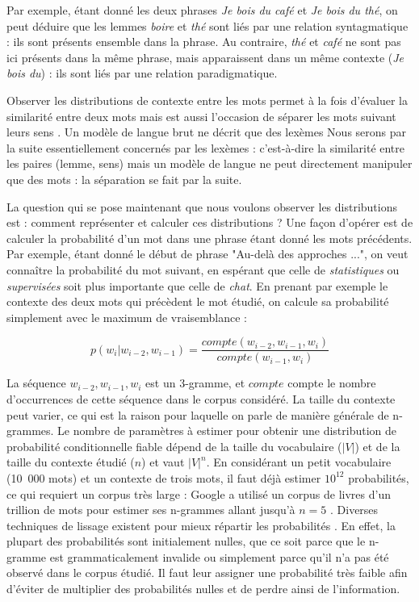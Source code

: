 Par exemple, étant donné les deux phrases \emph{Je bois du café} et \emph{Je
bois du thé}, on peut déduire que les lemmes \emph{boire} et \emph{thé} sont
liés par une relation syntagmatique : ils sont présents ensemble dans la
phrase. Au contraire, \emph{thé} et \emph{café} ne sont pas ici présents dans
la même phrase, mais apparaissent dans un même contexte (\emph{Je bois du}) :
ils sont liés par une relation paradigmatique.

Observer les distributions de contexte entre les mots permet à la fois
d'évaluer la similarité entre deux mots mais est aussi l'occasion de séparer
les mots suivant leurs sens \citep{yarowsky1993one,pantel2002discovering}. Un modèle de langue brut ne décrit que des lexèmes Nous
serons par la suite essentiellement concernés par les lexèmes : c'est-à-dire la
similarité entre les paires (lemme, sens) mais un modèle de langue ne peut
directement manipuler que des mots : la séparation se fait par la suite.


La question qui se pose maintenant que nous voulons observer les distributions
est : comment représenter et calculer ces distributions ? Une façon d'opérer
est de calculer la probabilité d'un mot dans une phrase étant donné les mots
précédents. Par exemple, étant donné le début de phrase "Au-delà des approches
...", on veut connaître la probabilité du mot suivant, en espérant que celle de
\emph{statistiques} ou \emph{supervisées} soit plus importante que celle de
\emph{chat}. En prenant par exemple le contexte des deux mots qui précèdent le
mot étudié, on calcule sa probabilité simplement avec le maximum de
vraisemblance :

\[
p(w_i|w_{i-2}, w_{i-1}) = \frac{compte(w_{i-2}, w_{i-1}, w_i)}{compte(w_{i-1}, w_i)}
\]

La séquence $w_{i-2}, w_{i-1}, w_{i}$ est un 3-gramme, et $compte$ compte le
nombre d'occurrences de cette séquence dans le corpus considéré. La taille du
contexte peut varier, ce qui est la raison pour laquelle on parle de manière
générale de n-grammes. Le nombre de paramètres à estimer pour obtenir une
distribution de probabilité conditionnelle fiable dépend de la taille du
vocabulaire ($|V|$) et de la taille du contexte étudié ($n$) et vaut $|V|^n$.
En considérant un petit vocabulaire (10~000 mots) et un contexte de trois mots,
il faut déjà estimer $10^{12}$ probabilités, ce qui requiert un corpus très
large : Google a utilisé un corpus de livres d'un trillion de mots pour estimer
ses n-grammes allant jusqu'à $n=5$ \citep{brants2006web}. Diverses techniques
de lissage existent pour mieux répartir les probabilités
\citep[Chapitre~4]{jurafsky2008speech}. En effet, la plupart des probabilités
sont initialement nulles, que ce soit parce que le n-gramme est
grammaticalement invalide ou simplement parce qu'il n'a pas été observé dans le
corpus étudié. Il faut leur assigner une probabilité très faible afin d'éviter
de multiplier des probabilités nulles et de perdre ainsi de l'information.

